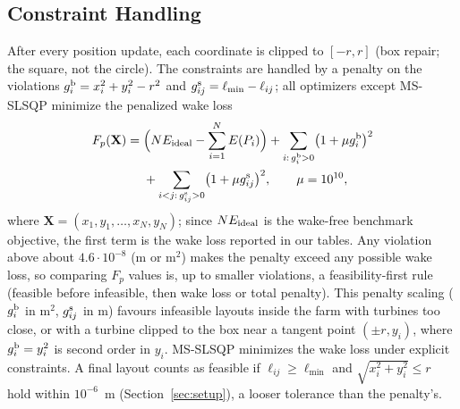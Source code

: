 \subsection{Constraint Handling}
\label{sec:constraints}
After every position update, each coordinate is clipped to $[-r,r]$ (box repair; the square, not the circle). The constraints are handled by a penalty on the violations $g^{\rm b}_{i}=x_i^2+y_i^2-r^2$ and $g^{\rm s}_{ij}=\ell_{\min}-\ell_{ij}$; all optimizers except MS-SLSQP minimize the penalized wake loss
\begin{equation}
\begin{split}
F_p(\mathbf X)={}&\Bigl(N E_{\rm ideal}-\sum_{i=1}^{N}E(P_i)\Bigr)+\sum_{i:\,g^{\rm b}_i>0}\bigl(1+\mu g^{\rm b}_i\bigr)^2\\
&+\sum_{i<j:\,g^{\rm s}_{ij}>0}\bigl(1+\mu g^{\rm s}_{ij}\bigr)^2,\qquad \mu=10^{10},
\end{split}
\label{eq:penalty}
\end{equation}
where $\mathbf X=(x_1,y_1,\ldots,x_N,y_N)$; since $N E_{\rm ideal}$ is the wake-free benchmark objective, the first term is the wake loss reported in our tables. Any violation above about $4.6\cdot10^{-8}$ (m or m$^2$) makes the penalty exceed any possible wake loss, so comparing $F_p$ values is, up to smaller violations, a feasibility-first rule (feasible before infeasible, then wake loss or total penalty). This penalty scaling ($g^{\rm b}_i$ in m$^2$, $g^{\rm s}_{ij}$ in m) favours infeasible layouts inside the farm with turbines too close, or with a turbine clipped to the box near a tangent point $(\pm r,y_i)$, where $g^{\rm b}_i=y_i^2$ is second order in $y_i$. MS-SLSQP minimizes the wake loss under explicit constraints. A final layout counts as feasible if $\ell_{ij}\ge\ell_{\min}$ and $\sqrt{x_i^2+y_i^2}\le r$ hold within $10^{-6}$~m (Section~\ref{sec:setup}), a looser tolerance than the penalty's.
